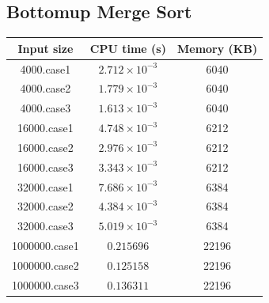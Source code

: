 \documentclass[11pt]{article}
\theoremstyle{definition}
\begin{document}
\subsection*{Bottomup Merge Sort}
\begin{center}
  \begin{tabular}{|c|c|c|}
    \hline 
    Input size & CPU time (s) & Memory (KB) \\ 
    \hline 
    4000.case1 & $2.712 \times 10^{-3}$ & 6040 \\
    \hline
    4000.case2 & $1.779 \times 10^{-3}$ & 6040 \\
    \hline
    4000.case3 & $1.613 \times 10^{-3}$ & 6040 \\
    \hline
    16000.case1 & $4.748 \times 10^{-3}$ & 6212 \\
    \hline 
    16000.case2 & $2.976 \times 10^{-3}$ & 6212 \\
    \hline
    16000.case3 & $3.343 \times 10^{-3}$ & 6212 \\
    \hline 
    32000.case1 & $7.686 \times 10^{-3}$ & 6384 \\
    \hline 
    32000.case2 & $4.384 \times 10^{-3}$ & 6384 \\
    \hline
    32000.case3 & $5.019 \times 10^{-3}$ & 6384 \\
    \hline 
    1000000.case1 & $0.215696$ & 22196 \\ 
    \hline 
    1000000.case2 & $0.125158$ & 22196 \\ 
    \hline 
    1000000.case3 & $0.136311$ & 22196 \\ 
    \hline
  \end{tabular}
\end{center}
\end{document}
